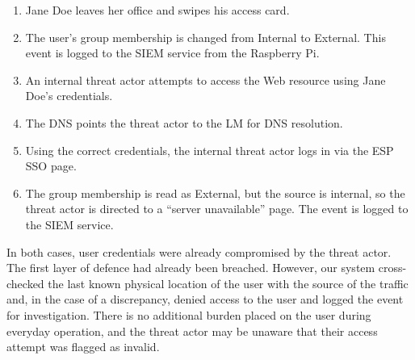 \begin{enumerate}
\item Jane Doe leaves her office and swipes his access card.
\item The user's group membership is changed from Internal to
  External.  This event is logged to the SIEM service from the
  Raspberry Pi.
\item An internal threat actor attempts to access the Web resource
  using Jane Doe's credentials.
\item The DNS points the threat actor to the LM for DNS resolution.
\item Using the correct credentials, the internal threat actor logs in
  via the ESP SSO page.
\item The group membership is read as External, but the source is
  internal, so the threat actor is directed to a ``server
  unavailable'' page.  The event is logged to the SIEM service.
\end{enumerate}

In both cases, user credentials were already compromised by the threat
actor.  The first layer of defence had already been breached.
However, our system cross-checked the last known physical location of
the user with the source of the traffic and, in the case of a
discrepancy, denied access to the user and logged the event for
investigation.  There is no additional burden placed on the user
during everyday operation, and the threat actor may be unaware that
their access attempt was flagged as invalid.
